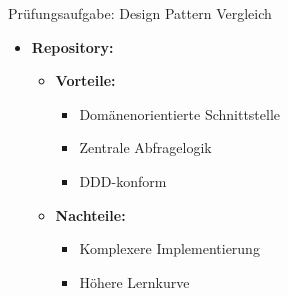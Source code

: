 \begin{example}{Prüfungsaufgabe: Design Pattern Vergleich}
\begin{itemize}
    \item \textbf{Repository:}
    \begin{itemize}
        \item \textbf{Vorteile:}
        \begin{itemize}
            \item Domänenorientierte Schnittstelle
            \item Zentrale Abfragelogik
            \item DDD-konform
        \end{itemize}
        \item \textbf{Nachteile:}
        \begin{itemize}
            \item Komplexere Implementierung
            \item Höhere Lernkurve
        \end{itemize}
    \end{itemize}
\end{itemize}
\end{example}

